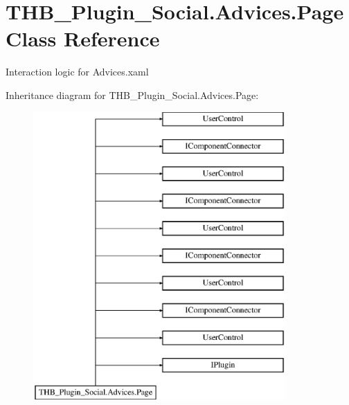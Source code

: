 \hypertarget{class_t_h_b___plugin___social_1_1_advices_1_1_page}{}\section{T\+H\+B\+\_\+\+Plugin\+\_\+\+Social.\+Advices.\+Page Class Reference}
\label{class_t_h_b___plugin___social_1_1_advices_1_1_page}


Interaction logic for Advices.\+xaml  


Inheritance diagram for T\+H\+B\+\_\+\+Plugin\+\_\+\+Social.\+Advices.\+Page\+:\begin{figure}[H]
\begin{center}
\leavevmode
\includegraphics[height=11.000000cm]{d7/dfb/class_t_h_b___plugin___social_1_1_advices_1_1_page}
\end{center}
\end{figure}
